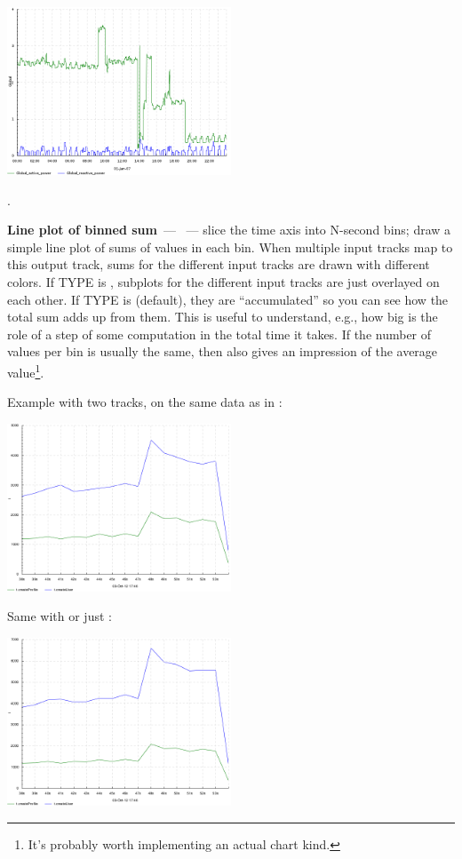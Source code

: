 \documentclass{article}
\begin{document}
\centerline{\includegraphics[width=0.5\textwidth]{pics/tplot/power-active-reactive.png}}.

\pagebreak
\noindent
\textbf{Line plot of binned sum}~--- ~--- slice the time axis into N-second bins; draw a simple line plot of sums of values in each bin. When multiple input tracks map to this output track, sums for the different input tracks are drawn with different colors. If TYPE is , subplots for the different input tracks are just overlayed on each other. If TYPE is  (default), they are ``accumulated'' so you can see how the total sum adds up from them. This is useful to understand, e.g., how big is the role of a step of some computation in the total time it takes. If the number of values per bin is usually the same, then  also gives an impression of the average value\footnote{It's probably worth implementing an actual  chart kind.}.

Example with two tracks, on the same data as in : 

\centerline{\includegraphics[width=0.5\textwidth]{pics/tplot/sum-create-user-and-profile-overlayed.png}}

Same with  or just :

\centerline{\includegraphics[width=0.5\textwidth]{pics/tplot/sum-create-user-and-profile-stacked.png}}
\end{document}

